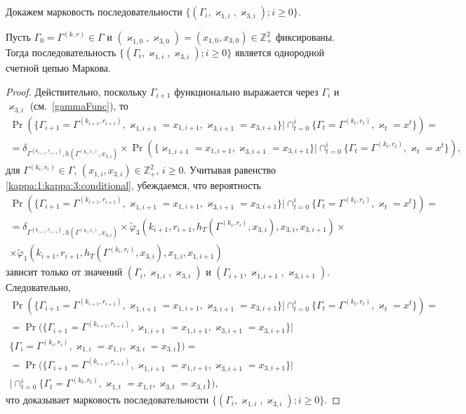 \documentclass{report}
\begin{document}
Докажем марковость последовательности $\{(\Gamma_i, \varkappa_{1,i},\varkappa_{3,i}); i \geqslant 0\}$.
\begin{theorem}
Пусть $\Gamma_0=\Gamma^{(k,r)}\in \Gamma$ и $(\varkappa_{1,0}, \varkappa_{3,0})=(x_{1,0}, x_{3,0})\in \mathbb{Z}_+^2$ фиксированы. Тогда последовательность $\{(\Gamma_i, \varkappa_{1,i},\varkappa_{3,i}); i \geqslant 0\}$ является однородной счетной цепью Маркова.
\end{theorem}
\begin{proof}
Действительно, поскольку $\Gamma_{i+1}$ функционально выражается через $\Gamma_i$ и $\varkappa_{3,i}$ (см.~\eqref{gammaFunc}), то
\begin{multline*}
\Pr (\{ \Gamma_{i+1} =\Gamma^{(k_{i+1},r_{i+1})},\varkappa_{1,i+1} = x_{1,i+1},\varkappa_{3,i+1} = x_{3,i+1}\} |\cap_{t=0}^{i}\{ \Gamma_t=\Gamma^{(k_t,r_t)}, \varkappa_t=x^t\})=\\
=\delta_{\Gamma^{(k_{i+1},r_{i+1})},h(\Gamma^{(k_i,r_i)},x_{3,i})}\times \Pr (\{ \varkappa_{1,i+1} = x_{1,i+1},  \varkappa_{3,i+1} = x_{3,i+1}\} |\cap_{t=0}^{i}\{ \Gamma_t=\Gamma^{(k_t,r_t)}, \varkappa_t=x^t\}),
\end{multline*}
для $\Gamma^{(k_i,r_i)}\in \Gamma$, $(x_{1,i}, x_{3,i})\in {\mathbb Z}_+^2$, $i\geqslant 0$. Учитывая равенство \eqref{kappa:1:kappa:3:conditional}, убеждаемся, что вероятность 
\begin{multline*}
\Pr (\{ \Gamma_{i+1} =\Gamma^{(k_{i+1},r_{i+1})},\varkappa_{1,i+1} = x_{1,i+1},\varkappa_{3,i+1} = x_{3,i+1}\} |\cap_{t=0}^{i}\{\Gamma_t=\Gamma^{(k_t,r_t)}, \varkappa_t=x^t\}) = \\
=\delta_{\Gamma^{(k_{i+1},r_{i+1})},h(\Gamma^{(k_i,r_i)},x_{3,i})} \times \widetilde{\varphi}_3(k_{i+1},r_{i+1},h_T(\Gamma^{(k_i,r_i)},x_{3,i}),x_{3,i},x_{3,i+1})
\times \\ \times \widetilde{\varphi}_1(k_{i+1},r_{i+1},h_T(\Gamma^{(k_i,r_i)},x_{3,i}),x_{1,i},x_{1,i+1})
\end{multline*}
зависит только от значений $(\Gamma_i,\varkappa_{1,i},\varkappa_{3,i})$ и $(\Gamma_{i+1},\varkappa_{1,i+1}, \varkappa_{3,i+1})$. Следовательно, 
\begin{multline*}
\Pr (\{ \Gamma_{i+1} =\Gamma^{(k_{i+1},r_{i+1})},\varkappa_{1,i+1} = x_{1,i+1},\varkappa_{3,i+1} = x_{3,i+1}\} |\cap_{t=0}^{i}\{\Gamma_t=\Gamma^{(k_t,r_t)}, \varkappa_t=x^t\})=\\
=\Pr (\{  \Gamma_{i+1} =\Gamma^{(k_{i+1},r_{i+1})},\varkappa_{1,i+1} = x_{1,i+1},\varkappa_{3,i+1} = x_{3,i+1}\} | \\ \{ \Gamma_i=\Gamma^{(k_i,r_i)},\varkappa_{1,i}=x_{1,i}, \varkappa_{3,i}=x_{3,i}\}) = \\
=\Pr (\{ \Gamma_{i+1} =\Gamma^{(k_{i+1},r_{i+1})}, \varkappa_{1,i+1} = x_{1,i+1},\varkappa_{3,i+1} = x_{3,i+1}\} |\\ |\cap_{t=0}^{i}\{ \Gamma_t=\Gamma^{(k_t,r_t)}, \varkappa_{1,t}=x_{1,t}, \varkappa_{3,t}=x_{3,t}\}),
\end{multline*}
что доказывает марковость последовательности $\{(\Gamma_i, \varkappa_{1,i},\varkappa_{3,i}); i \geqslant 0\}$.
\end{proof}
\end{document}
